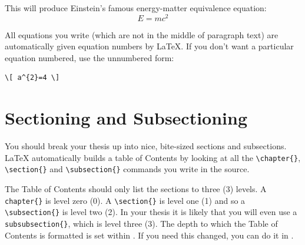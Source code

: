 \documentclass[
12pt, %
english, %
doublespacing, %
nolistspacing, %
liststotoc, %
headsepline, %
chapterinoneline, %
openany, %
]{DoctoralThesis}\usepackage[]{graphicx}\usepackage[]{color}
\begin{document}
This will produce Einstein's famous energy-matter equivalence equation:
\begin{equation}
E = mc^{2}
\label{eqn:Einstein}
\end{equation}

All equations you write (which are not in the middle of paragraph text) are automatically given equation numbers by \LaTeX{}. If you don't want a particular equation numbered, use the unnumbered form:
\begin{verbatim}
\[ a^{2}=4 \]
\end{verbatim}


\section{Sectioning and Subsectioning}

You should break your thesis up into nice, bite-sized sections and subsections. \LaTeX{} automatically builds a table of Contents by looking at all the \verb|\chapter{}|, \verb|\section{}|  and \verb|\subsection{}| commands you write in the source.

The Table of Contents should only list the sections to three (3) levels. A \verb|chapter{}| is level zero (0). A \verb|\section{}| is level one (1) and so a \verb|\subsection{}| is level two (2). In your thesis it is likely that you will even use a \verb|subsubsection{}|, which is level three (3). The depth to which the Table of Contents is formatted is set within . If you need this changed, you can do it in .

\end{document}
